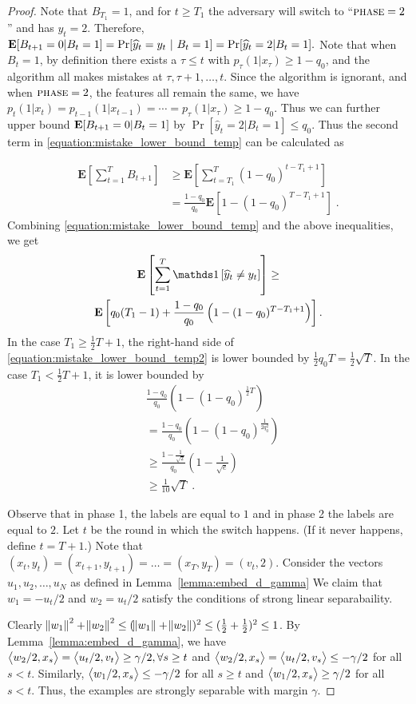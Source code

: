 \begin{proof}
Note that $B_{T_1}=1$, and for $t \ge T_1$ the adversary will switch to
``$\textsc{phase}=2$'' and has $y_t=2$. Therefore,
$\operatorname*{\mathbf{E}}[B_{t+1}=0|B_{t}=1]=\Pr[\widehat y_t=y_t~|~B_t=1] = \Pr[\widehat
y_t=2|B_t=1].$ Note that when $B_t=1$, by definition there exists a $\tau\le t$
with $p_\tau(1|x_\tau)\ge 1-q_0$, and the algorithm all makes mistakes at $\tau,
\tau+1, \ldots, t$. Since the algorithm is ignorant, and when
$\textsc{phase}=2$, the features all remain the same, we have
$p_t(1|x_t)=p_{t-1}(1|x_{t-1})=\cdots=p_\tau(1|x_\tau)\ge 1-q_0$. Thus we can
further upper bound $\operatorname*{\mathbf{E}}[B_{t+1}=0|B_{t}=1]$ by $\Pr[\widehat y_t=2|B_t=1]\leq
q_0$. Thus the second term in \eqref{equation:mistake_lower_bound_temp} can be
calculated as

\begin{align*}
\mathbf{E}\left[\sum_{t=1}^T B_{t+1}\right]
& \ge \mathbf{E}\left[\sum_{t=T_1}^T (1-q_0)^{t-T_1+1} \right] \\
& = \frac{1-q_0}{q_0}\mathbf{E}\left[1-(1-q_0)^{T - T_1 + 1}\right] \; .
\end{align*}
Combining \eqref{equation:mistake_lower_bound_temp} and the above inequalities, we get
\begin{multline}
\label{equation:mistake_lower_bound_temp2}
\mathbf{E} \left[\sum_{t=1}^T \indicator{\widehat y_t\neq y_t}\right] \ge
\\ \mathbf{E}\left[q_0(T_1-1)+\frac{1-q_0}{q_0}\left(1-(1-q_0)^{T-T_1+1}\right)\right].
\end{multline}
In the case $T_1\ge \frac{1}{2}T + 1$, the right-hand side of
\eqref{equation:mistake_lower_bound_temp2} is lower bounded by
$\frac{1}{2}q_0 T = \frac{1}{2} \sqrt{T}$. In the case
$T_1< \frac{1}{2}T+1$, it is lower bounded by
\begin{align*}
& \frac{1-q_0}{q_0}\left(1-(1-q_0)^{\frac{1}{2}T}\right) \\
& = \frac{1-q_0}{q_0}\left(1-(1-q_0)^{\frac{1}{2q_0^2}}\right) \\
& \ge \frac{1-\frac{1}{\sqrt{2}}}{q_0}\left(1-\frac{1}{\sqrt{e}}\right) \\
& \ge \frac{1}{10} \sqrt{T} \; .
\end{align*}

Observe that in phase 1, the labels are equal to $1$ and in phase 2 the labels
are equal to $2$. Let $t$ be the round in which the switch happens. (If it never
happens, define $t=T+1$.) Note that $(x_t, y_t)=(x_{t+1}, y_{t+1})= \dots =
(x_T, y_T) = (v_t, 2)$. Consider the vectors $u_1, u_2, \dots, u_N$ as defined
in Lemma~\ref{lemma:embed_d_gamma} We claim that $w_1=-u_t/2$ and $w_2=u_t/2$
satisfy the conditions of strong linear separabaility.

Clearly $\norm{w_1}^2 + \norm{w_2}^2 \le (\norm{w_1} + \norm{w_2})^2 \le
(\frac{1}{2} + \frac{1}{2})^2 \le 1$. By Lemma~\ref{lemma:embed_d_gamma}, we
have $\left\langle w_2/2, x_s \right\rangle = \left\langle u_t/2, v_t \right\rangle \ge \gamma/2, \forall s \ge t$ and
$\left\langle w_2/2, x_s \right\rangle = \left\langle u_t/2, v_s \right\rangle \le - \gamma/2$ for all $s<t$. Similarly,
$\left\langle w_1/2, x_s \right\rangle \le -\gamma/2$ for all $s \ge t$ and $\left\langle w_1/2, x_s \right\rangle \ge
\gamma/2$ for all $s < t$. Thus, the examples are strongly separable with margin
$\gamma$.
\end{proof}
